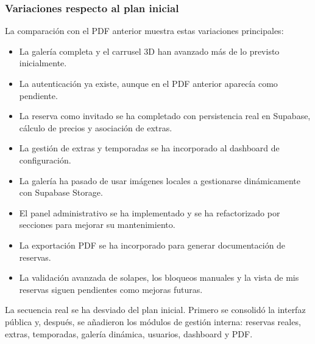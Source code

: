 \documentclass[11pt,a4paper]{article}
\begin{document}
\subsubsection{Variaciones respecto al plan inicial}
La comparación con el PDF anterior muestra estas variaciones principales:
\begin{itemize}[leftmargin=1.4cm]
  \item La galería completa y el carrusel 3D han avanzado más de lo previsto inicialmente.
  \item La autenticación ya existe, aunque en el PDF anterior aparecía como pendiente.
  \item La reserva como invitado se ha completado con persistencia real en Supabase, cálculo de precios y asociación de extras.
  \item La gestión de extras y temporadas se ha incorporado al dashboard de configuración.
  \item La galería ha pasado de usar imágenes locales a gestionarse dinámicamente con Supabase Storage.
  \item El panel administrativo se ha implementado y se ha refactorizado por secciones para mejorar su mantenimiento.
  \item La exportación PDF se ha incorporado para generar documentación de reservas.
  \item La validación avanzada de solapes, los bloqueos manuales y la vista de mis reservas siguen pendientes como mejoras futuras.
\end{itemize}

La secuencia real se ha desviado del plan inicial. Primero se consolidó la interfaz pública y, después, se añadieron los módulos de gestión interna: reservas reales, extras, temporadas, galería dinámica, usuarios, dashboard y PDF.
\end{document}
